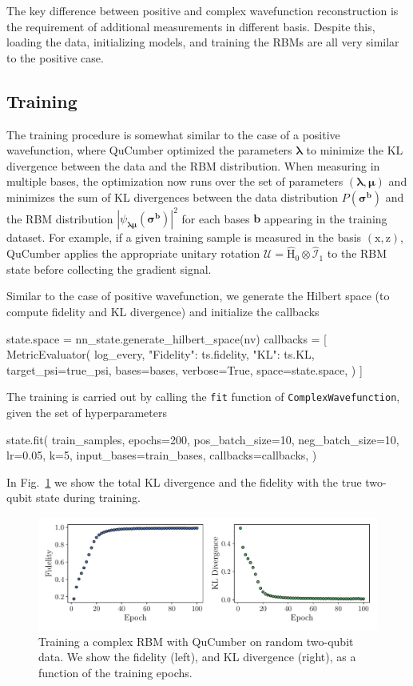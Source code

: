 \documentclass[submission, Phys, hidelnks]{SciPost}
\begin{document}
The key difference between positive and complex wavefunction reconstruction is the requirement of additional measurements in different basis. Despite this, loading the data, initializing models, and training the RBMs are all very similar to the positive case.

\subsection{Training}
The training procedure is somewhat similar to the case of a positive wavefunction, where QuCumber optimized the parameters $\bm{\lambda}$ to minimize the KL divergence between the data and the RBM distribution. When measuring in multiple bases, the optimization now runs over the set of parameters $(\bm{\lambda},\bm{\mu})$ and minimizes the sum of KL divergences between the data distribution $P(\bm{\sigma}^{\bm{b}})$ and the RBM distribution $|\psi_{\bm{\lambda\mu}}(\bm{\sigma}^{\bm{b}})|^2$ for each bases $\bm{b}$ appearing in the training dataset. For example, if a given training sample is measured in the basis $(\mathrm{x},\mathrm{z})$, QuCumber applies the appropriate unitary rotation $\bm{\mathcal{U}}=\hat{\mathrm{H}}_0\otimes\hat{\mathcal{I}}_1$ to the RBM state before collecting the gradient signal. 

Similar to the case of positive wavefunction, we generate the Hilbert space (to compute fidelity and KL divergence) and initialize the callbacks
\begin{python}
state.space = nn_state.generate_hilbert_space(nv)
callbacks = [
  MetricEvaluator(
    log_every,
    {"Fidelity": ts.fidelity, "KL": ts.KL},
    target_psi=true_psi,
    bases=bases,
    verbose=True,
    space=state.space,
  )
]

\end{python}
The training is carried out by calling the \verb|fit| function of \verb|ComplexWavefunction|, given the set of hyperparameters
\begin{python}
state.fit(
    train_samples,
    epochs=200,
    pos_batch_size=10,
    neg_batch_size=10,
    lr=0.05,
    k=5,
    input_bases=train_bases,
    callbacks=callbacks,
)
\end{python}

In Fig.~\ref{fig:complex} we show the total KL divergence and the fidelity with the true two-qubit state during training. 
\begin{figure}[htb]
    \centering{}
    \includegraphics[width=\textwidth, trim={0 15 0 0}, clip]{complex_fid_KL.pdf}
    \caption{\label{fig:complex} Training a complex RBM with QuCumber on random two-qubit data. We show the fidelity (left), and KL divergence (right), as a function of the training epochs.}
\end{figure}
\end{document}
